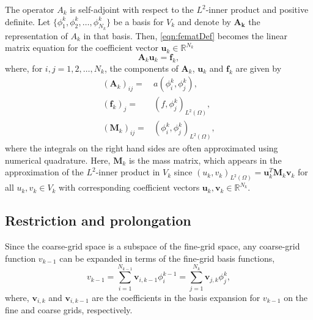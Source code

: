 \documentclass[times]{nlaauth}
\begin{document}
The operator $A_k$ is self-adjoint
with respect to the $L^2$-inner product and positive definite.
Let $\{\phi_1^k,\phi_2^k,\ldots,\phi_{N_k}^k\}$ be a basis for $V_k$ and
denote by $\mathbf{A_k}$ the representation of $A_k$ in that
basis. Then, \eqref{eqn:fematDef} becomes the linear matrix equation
for the coefficient vector $\mathbf{u}_k\in \mathbb{R}^{N_k}$
\begin{equation}
\mathbf{A}_k\mathbf{u}_k = \mathbf{f}_k,
\end{equation}
where, for $i,j = 1,2,\ldots,N_k$, the components of $\mathbf A_k$, $\mathbf u_k$ and $\mathbf f_k$ are given by
\begin{align*}
(\mathbf{A}_k)_{ij} =& a(\phi_i^k,\phi_j^k), \\%
(\mathbf{f}_{k})_j   =& (f,\phi_j^k)_{L^2(\Omega)}, \\%
(\mathbf{M}_k)_{ij} =& (\phi_i^k,\phi_j^k)_{L^2(\Omega)},
\end{align*}
where the integrals on the right hand sides are often approximated
using numerical quadrature.
Here, $\mathbf{M}_k$ is the mass matrix, which appears in the
approximation of the $L^2$-inner product in $V_k$ since
$(u_k,v_k)_{L^2(\Omega)} = \mathbf{u}_k^T\mathbf{M}_k\mathbf{v}_k$ for
all $u_k,v_k\in V_k$ with corresponding coefficient vectors
$\mathbf{u}_k,\mathbf{v}_k\in \mathbb{R}^{N_k}$.



\subsection{Restriction and prolongation} %
\label{sub:restriction_&_prolongation}
Since the coarse-grid space is a subspace of the fine-grid
space, any coarse-grid function $v_{k-1}$ can be expanded in
terms of the fine-grid basis functions,
\begin{equation} 
  v_{k-1} = \sum_{i=1}^{N_{k-1}} \mathbf v_{i,k-1}\phi_i^{k-1} = \sum_{j=1}^{N_k} \mathbf v_{j,k}\phi_j^k, 
\end{equation} 
where, $\mathbf v_{i,k}$ and $\mathbf v_{i,k-1}$ are the coefficients in the basis
expansion for $v_{k-1}$ on the fine and coarse grids, respectively.
\end{document}
